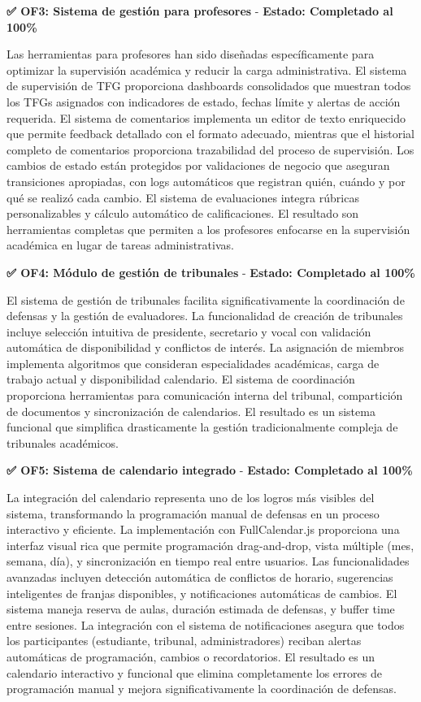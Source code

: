 \documentclass[12pt,a4paper,oneside]{report}
\begin{document}
\textbf{✅ OF3: Sistema de gestión para profesores} - \textbf{Estado: Completado al 100\%}

Las herramientas para profesores han sido diseñadas específicamente para optimizar la supervisión académica y reducir la carga administrativa. El sistema de supervisión de TFG proporciona dashboards consolidados que muestran todos los TFGs asignados con indicadores de estado, fechas límite y alertas de acción requerida. El sistema de comentarios implementa un editor de texto enriquecido que permite feedback detallado con el formato adecuado, mientras que el historial completo de comentarios proporciona trazabilidad del proceso de supervisión. Los cambios de estado están protegidos por validaciones de negocio que aseguran transiciones apropiadas, con logs automáticos que registran quién, cuándo y por qué se realizó cada cambio. El sistema de evaluaciones integra rúbricas personalizables y cálculo automático de calificaciones. El resultado son herramientas completas que permiten a los profesores enfocarse en la supervisión académica en lugar de tareas administrativas.

\textbf{✅ OF4: Módulo de gestión de tribunales} - \textbf{Estado: Completado al 100\%}

El sistema de gestión de tribunales facilita significativamente la coordinación de defensas y la gestión de evaluadores. La funcionalidad de creación de tribunales incluye selección intuitiva de presidente, secretario y vocal con validación automática de disponibilidad y conflictos de interés. La asignación de miembros implementa algoritmos que consideran especialidades académicas, carga de trabajo actual y disponibilidad calendario. El sistema de coordinación proporciona herramientas para comunicación interna del tribunal, compartición de documentos y sincronización de calendarios. El resultado es un sistema funcional que simplifica drasticamente la gestión tradicionalmente compleja de tribunales académicos.

\textbf{✅ OF5: Sistema de calendario integrado} - \textbf{Estado: Completado al 100\%}

La integración del calendario representa uno de los logros más visibles del sistema, transformando la programación manual de defensas en un proceso interactivo y eficiente. La implementación con FullCalendar.js proporciona una interfaz visual rica que permite programación drag-and-drop, vista múltiple (mes, semana, día), y sincronización en tiempo real entre usuarios. Las funcionalidades avanzadas incluyen detección automática de conflictos de horario, sugerencias inteligentes de franjas disponibles, y notificaciones automáticas de cambios. El sistema maneja reserva de aulas, duración estimada de defensas, y buffer time entre sesiones. La integración con el sistema de notificaciones asegura que todos los participantes (estudiante, tribunal, administradores) reciban alertas automáticas de programación, cambios o recordatorios. El resultado es un calendario interactivo y funcional que elimina completamente los errores de programación manual y mejora significativamente la coordinación de defensas.
\end{document}
